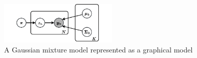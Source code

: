 \begin{figure}[hptb]
    \centering
    \includegraphics[width=0.5\textwidth]{figs/mixgaussian.pdf}
    \caption{A Gaussian mixture model represented as a graphical model}
    \label{fig:mixgaussian}
\end{figure}